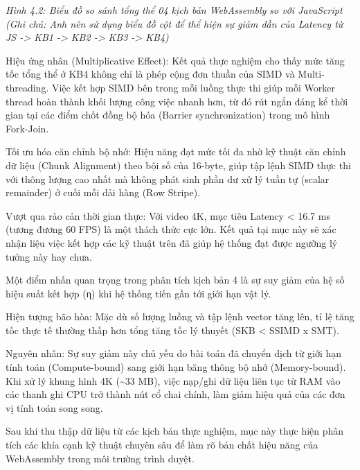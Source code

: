 \begin{center}\textit{Hình 4.2: Biểu đồ so sánh tổng thể 04 kịch bản WebAssembly so với JavaScript (Ghi chú: Anh nên sử dụng biểu đồ cột để thể hiện sự giảm dần của Latency từ JS -\textgreater{} KB1 -\textgreater{} KB2 -\textgreater{} KB3 -\textgreater{} KB4)}\end{center}


Hiệu ứng nhân (Multiplicative Effect): Kết quả thực nghiệm cho thấy mức tăng tốc tổng thể ở KB4 không chỉ là phép cộng đơn thuần của SIMD và Multi-threading. Việc kết hợp SIMD bên trong mỗi luồng thực thi giúp mỗi Worker thread hoàn thành khối lượng công việc nhanh hơn, từ đó rút ngắn đáng kể thời gian tại các điểm chốt đồng bộ hóa (Barrier synchronization) trong mô hình Fork-Join.


Tối ưu hóa căn chỉnh bộ nhớ: Hiệu năng đạt mức tối đa nhờ kỹ thuật căn chỉnh dữ liệu (Chunk Alignment) theo bội số của 16-byte, giúp tập lệnh SIMD thực thi với thông lượng cao nhất mà không phát sinh phần dư xử lý tuần tự (scalar remainder) ở cuối mỗi dải hàng (Row Stripe).


Vượt qua rào cản thời gian thực: Với video 4K, mục tiêu Latency \textless{} 16.7 ms (tương đương 60 FPS) là một thách thức cực lớn. Kết quả tại mục này sẽ xác nhận liệu việc kết hợp các kỹ thuật trên đã giúp hệ thống đạt được ngưỡng lý tưởng này hay chưa.



Một điểm nhấn quan trọng trong phân tích kịch bản 4 là sự suy giảm của hệ số hiệu suất kết hợp (η) khi hệ thống tiến gần tới giới hạn vật lý.


Hiện tượng bão hòa: Mặc dù số lượng luồng và tập lệnh vector tăng lên, tỉ lệ tăng tốc thực tế thường thấp hơn tổng tăng tốc lý thuyết (SKB \textless{} SSIMD x SMT).


Nguyên nhân: Sự suy giảm này chủ yếu do bài toán đã chuyển dịch từ giới hạn tính toán (Compute-bound) sang giới hạn băng thông bộ nhớ (Memory-bound). Khi xử lý khung hình 4K (\textasciitilde{}33 MB), việc nạp/ghi dữ liệu liên tục từ RAM vào các thanh ghi CPU trở thành nút cổ chai chính, làm giảm hiệu quả của các đơn vị tính toán song song.



Sau khi thu thập dữ liệu từ các kịch bản thực nghiệm, mục này thực hiện phân tích các khía cạnh kỹ thuật chuyên sâu để làm rõ bản chất hiệu năng của WebAssembly trong môi trường trình duyệt.


